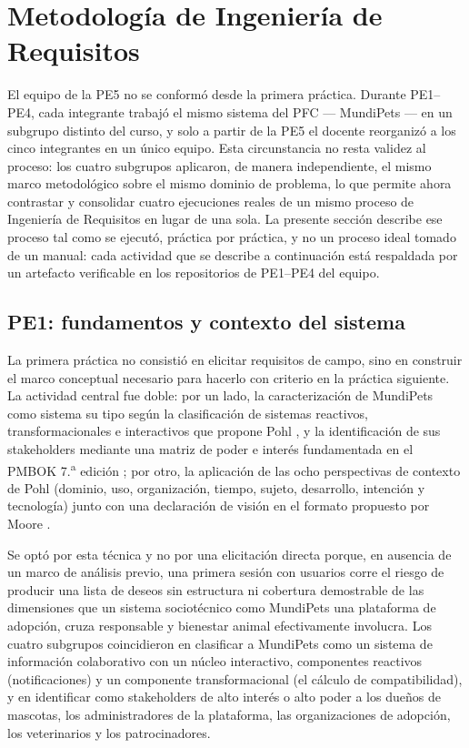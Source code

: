 \documentclass[journal,onecolumn]{IEEEtran}
\begin{document}

\section{Metodología de Ingeniería de Requisitos}
\label{sec:metodologia}

El equipo de la PE5 no se conformó desde la primera práctica. Durante PE1--PE4, cada
integrante trabajó el mismo sistema del PFC --- MundiPets --- en un subgrupo distinto del
curso, y solo a partir de la PE5 el docente reorganizó a los cinco integrantes en un único
equipo. Esta circunstancia no resta validez al proceso: los cuatro subgrupos aplicaron, de
manera independiente, el mismo marco
metodológico sobre el mismo dominio de problema, lo que permite ahora contrastar y
consolidar cuatro ejecuciones reales de un mismo proceso de Ingeniería de Requisitos en
lugar de una sola. La presente sección describe ese proceso tal como se ejecutó,
práctica por práctica, y no un proceso ideal tomado de un manual: cada actividad que se
describe a continuación está respaldada por un artefacto verificable en los repositorios
de PE1--PE4 del equipo.

\subsection{PE1: fundamentos y contexto del sistema}

La primera práctica no consistió en elicitar requisitos de campo, sino en construir el
marco conceptual necesario para hacerlo con criterio en la práctica siguiente. La actividad
central fue doble: por un lado, la caracterización de MundiPets como sistema  su tipo
según la clasificación de sistemas reactivos, transformacionales e interactivos que
propone Pohl \cite{pohl2025}, y la identificación de sus stakeholders mediante una matriz
de poder e interés fundamentada en el PMBOK 7.\textsuperscript{a} edición \cite{pmbok7};
por otro, la aplicación de las ocho perspectivas de contexto de Pohl (dominio, uso,
organización, tiempo, sujeto, desarrollo, intención y tecnología) junto con una declaración
de visión en el formato propuesto por Moore \cite{pohl2025}. 

Se optó por esta técnica y no
por una elicitación directa porque, en ausencia de un marco de análisis previo, una primera
sesión con usuarios corre el riesgo de producir una lista de deseos sin estructura ni
cobertura demostrable de las dimensiones que un sistema sociotécnico como MundiPets
 una plataforma de adopción, cruza responsable y bienestar animal efectivamente
involucra. Los cuatro subgrupos coincidieron en clasificar a MundiPets como un sistema de
información colaborativo con un núcleo interactivo, componentes reactivos (notificaciones)
y un componente transformacional (el cálculo de compatibilidad), y en identificar como
stakeholders de alto interés o alto poder a los dueños de mascotas, los administradores de
la plataforma, las organizaciones de adopción, los veterinarios y los patrocinadores.
\end{document}
